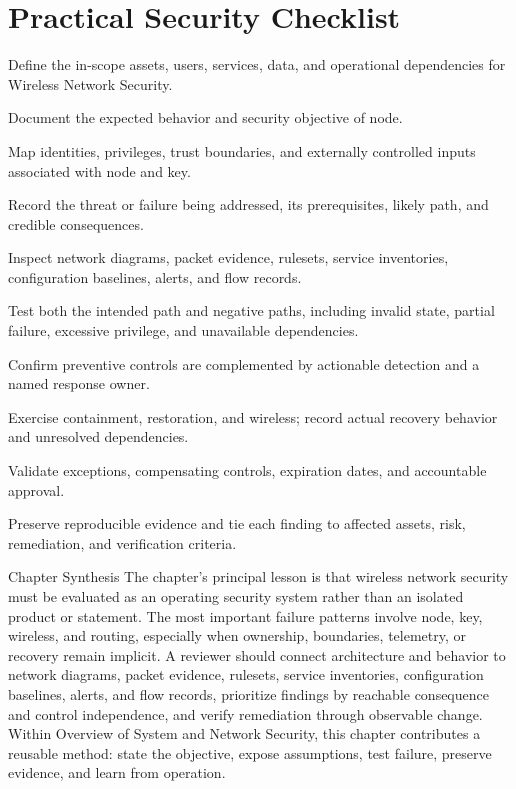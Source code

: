 \documentclass[11pt,letterpaper]{article}
\begin{document}
\section*{Practical Security Checklist}
\begin{CornellChecklist}
\item Define the in-scope assets, users, services, data, and operational dependencies for Wireless Network Security.
\item Document the expected behavior and security objective of node.
\item Map identities, privileges, trust boundaries, and externally controlled inputs associated with node and key.
\item Record the threat or failure being addressed, its prerequisites, likely path, and credible consequences.
\item Inspect network diagrams, packet evidence, rulesets, service inventories, configuration baselines, alerts, and flow records.
\item Test both the intended path and negative paths, including invalid state, partial failure, excessive privilege, and unavailable dependencies.
\item Confirm preventive controls are complemented by actionable detection and a named response owner.
\item Exercise containment, restoration, and wireless; record actual recovery behavior and unresolved dependencies.
\item Validate exceptions, compensating controls, expiration dates, and accountable approval.
\item Preserve reproducible evidence and tie each finding to affected assets, risk, remediation, and verification criteria.
\end{CornellChecklist}
\begin{CornellSummaryBox}{Chapter Synthesis}
The chapter's principal lesson is that wireless network security must be evaluated as an operating security system rather than an isolated product or statement. The most important failure patterns involve node, key, wireless, and routing, especially when ownership, boundaries, telemetry, or recovery remain implicit. A reviewer should connect architecture and behavior to network diagrams, packet evidence, rulesets, service inventories, configuration baselines, alerts, and flow records, prioritize findings by reachable consequence and control independence, and verify remediation through observable change. Within Overview of System and Network Security, this chapter contributes a reusable method: state the objective, expose assumptions, test failure, preserve evidence, and learn from operation.
\end{CornellSummaryBox}
\end{document}
